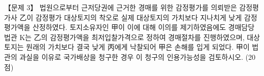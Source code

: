 \begin{longquestion}{【문제 3】}
법원으로부터 근저당권에 근거한 경매를 위한 감정평가를 의뢰받은 감정평가사 乙이 감정평가 대상토지의 착오로 실제 대상토지의 가치보다 지나치게 낮게 감정평가액을 산정하였다. 토지소유자인 甲이 이에 대해 이의를 제기하였음에도 경매담당 법관 K는 乙의 감정평가액을 최저입찰가격으로 정하여 경매절차를 진행하였으며, 대상토지는 원래의 가치보다 결국 낮게 丙에게 낙찰되어 甲은 손해를 입게 되었다. 甲이 법관의 과실을 이유로 국가배상을 청구한 경우 이 청구의 인용가능성을 검토하시오. (20점) \par
\end{longquestion}
